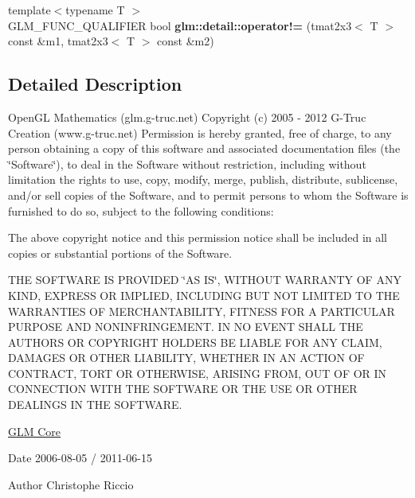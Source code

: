 \begin{DoxyCompactItemize}
\item 
\hypertarget{namespaceglm_1_1detail_a1d115764911dd070526a224c2f6a1311}{{\footnotesize template$<$typename T $>$ }\\G\-L\-M\-\_\-\-F\-U\-N\-C\-\_\-\-Q\-U\-A\-L\-I\-F\-I\-E\-R bool {\bfseries glm\-::detail\-::operator!=} (tmat2x3$<$ T $>$ const \&m1, tmat2x3$<$ T $>$ const \&m2)}\label{namespaceglm_1_1detail_a1d115764911dd070526a224c2f6a1311}

\end{DoxyCompactItemize}


\subsection{Detailed Description}
Open\-G\-L Mathematics (glm.\-g-\/truc.\-net) Copyright (c) 2005 -\/ 2012 G-\/\-Truc Creation (www.\-g-\/truc.\-net) Permission is hereby granted, free of charge, to any person obtaining a copy of this software and associated documentation files (the \char`\"{}\-Software\char`\"{}), to deal in the Software without restriction, including without limitation the rights to use, copy, modify, merge, publish, distribute, sublicense, and/or sell copies of the Software, and to permit persons to whom the Software is furnished to do so, subject to the following conditions\-:

The above copyright notice and this permission notice shall be included in all copies or substantial portions of the Software.

T\-H\-E S\-O\-F\-T\-W\-A\-R\-E I\-S P\-R\-O\-V\-I\-D\-E\-D \char`\"{}\-A\-S I\-S\char`\"{}, W\-I\-T\-H\-O\-U\-T W\-A\-R\-R\-A\-N\-T\-Y O\-F A\-N\-Y K\-I\-N\-D, E\-X\-P\-R\-E\-S\-S O\-R I\-M\-P\-L\-I\-E\-D, I\-N\-C\-L\-U\-D\-I\-N\-G B\-U\-T N\-O\-T L\-I\-M\-I\-T\-E\-D T\-O T\-H\-E W\-A\-R\-R\-A\-N\-T\-I\-E\-S O\-F M\-E\-R\-C\-H\-A\-N\-T\-A\-B\-I\-L\-I\-T\-Y, F\-I\-T\-N\-E\-S\-S F\-O\-R A P\-A\-R\-T\-I\-C\-U\-L\-A\-R P\-U\-R\-P\-O\-S\-E A\-N\-D N\-O\-N\-I\-N\-F\-R\-I\-N\-G\-E\-M\-E\-N\-T. I\-N N\-O E\-V\-E\-N\-T S\-H\-A\-L\-L T\-H\-E A\-U\-T\-H\-O\-R\-S O\-R C\-O\-P\-Y\-R\-I\-G\-H\-T H\-O\-L\-D\-E\-R\-S B\-E L\-I\-A\-B\-L\-E F\-O\-R A\-N\-Y C\-L\-A\-I\-M, D\-A\-M\-A\-G\-E\-S O\-R O\-T\-H\-E\-R L\-I\-A\-B\-I\-L\-I\-T\-Y, W\-H\-E\-T\-H\-E\-R I\-N A\-N A\-C\-T\-I\-O\-N O\-F C\-O\-N\-T\-R\-A\-C\-T, T\-O\-R\-T O\-R O\-T\-H\-E\-R\-W\-I\-S\-E, A\-R\-I\-S\-I\-N\-G F\-R\-O\-M, O\-U\-T O\-F O\-R I\-N C\-O\-N\-N\-E\-C\-T\-I\-O\-N W\-I\-T\-H T\-H\-E S\-O\-F\-T\-W\-A\-R\-E O\-R T\-H\-E U\-S\-E O\-R O\-T\-H\-E\-R D\-E\-A\-L\-I\-N\-G\-S I\-N T\-H\-E S\-O\-F\-T\-W\-A\-R\-E.

\hyperlink{group__core}{G\-L\-M Core}

\begin{DoxyDate}{Date}
2006-\/08-\/05 / 2011-\/06-\/15 
\end{DoxyDate}
\begin{DoxyAuthor}{Author}
Christophe Riccio 
\end{DoxyAuthor}
